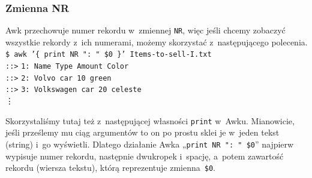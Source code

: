 \documentclass[10pt,t]{beamer}
\begin{document}
\begin{frame}
  \frametitle{Zmienna NR}


  Awk przechowuje numer rekordu w~zmiennej \texttt{NR}, więc jeśli chcemy
  zobaczyć wszystkie rekordy z~ich numerami, możemy skorzystać
  z~następującego polecenia. \\
  \texttt{\$ awk '\{ print NR ": " \$0 \}' Items-to-sell-I.txt} \\
  \texttt{::>} \texttt{1: Name Type Amount Color} \\
  \texttt{::>} \texttt{2: Volvo car 10 green} \\
  \texttt{::>} \texttt{3: Volkswagen car 20 celeste} \\
  \hspace{3em} \vdots

  Skorzystaliśmy tutaj też z~następującej własności \texttt{print} w~Awku.
  Mianowicie, jeśli prześlemy mu ciąg argumentów to on po prostu sklei je
  w~jeden tekst (string) i~go wyświetli. Dlatego działanie Awka
  „\texttt{print NR ": " \hspace{0.25em} \$0}” najpierw wypisuje numer
  rekordu, następnie dwukropek i~spację, a~potem zawartość rekordu (wiersza
  tekstu), którą reprezentuje zmienna~\texttt{\$0}.


\end{frame}
\end{document}

